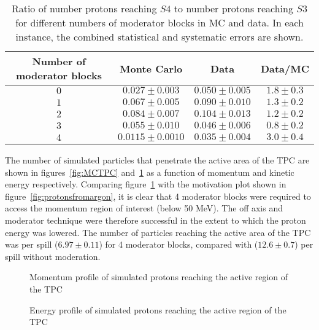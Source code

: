 \begin{table}
  \centering
  \caption{Ratio of number protons reaching $\mathit{S4}$ to number protons reaching $\mathit{S3}$ for different numbers of moderator blocks in MC and data. In each instance, the combined statistical and systematic errors are shown.}
  \begin{tabular}{|c|c|c|c|}
    \hline 
    Number of moderator blocks & Monte Carlo & Data & Data/MC\\
    \hline
    $0$ & $0.027 \pm 0.003$ & $0.050 \pm 0.005$ & $1.8 \pm 0.3$ \\
    $1$ & $0.067 \pm 0.005$ & $0.090 \pm 0.010$ & $1.3 \pm 0.2$ \\
    $2$ & $0.084 \pm 0.007$ & $0.104 \pm 0.013$ & $1.2 \pm 0.2$ \\
    $3$ & $0.055 \pm 0.010$ & $0.046 \pm 0.006$ & $0.8 \pm 0.2$ \\
    $4$ & $0.0115 \pm 0.0010$ & $0.035 \pm 0.004$ & $3.0 \pm 0.4$ \\
    \hline
  \end{tabular}
  \label{tab:ratios}
\end{table}

The number of simulated particles that penetrate the active area of the TPC are shown in figures~\ref{fig:MCTPC} and~\ref{fig:MCKE} as a function of momentum and kinetic energy respectively.
Comparing figure~\ref{fig:MCKE} with the motivation plot shown in figure~\ref{fig:protonsfromargon}, it is clear that 4 moderator blocks were required to access the momentum region of interest (below 50 MeV).
The off axis and moderator technique were therefore successful in the extent to which the proton energy was lowered.
The number of particles reaching the active area of the TPC was  per spill ($6.97 \pm  0.11$) for 4 moderator blocks, compared with ($12.6 \pm 0.7$) per spill without moderation.

\begin{figure}[!ht]
  \begin{minipage}[t]{0.48\textwidth}
    \begin{adjustbox}{max totalsize={\textwidth}{.35\textheight}, center}
      
    \end{adjustbox}
    \caption{Momentum profile of simulated protons reaching the active region of the TPC}
    \label{fig:MCTPC}
  \end{minipage}
  \hspace{0.3cm}
  \begin{minipage}[t]{0.48\textwidth}
    \begin{adjustbox}{max totalsize={\textwidth}{.35\textheight}, center}
      
    \end{adjustbox}
    \caption{Energy profile of simulated protons reaching the active region of the TPC}
    \label{fig:MCKE}
  \end{minipage}	
\end{figure}
    
